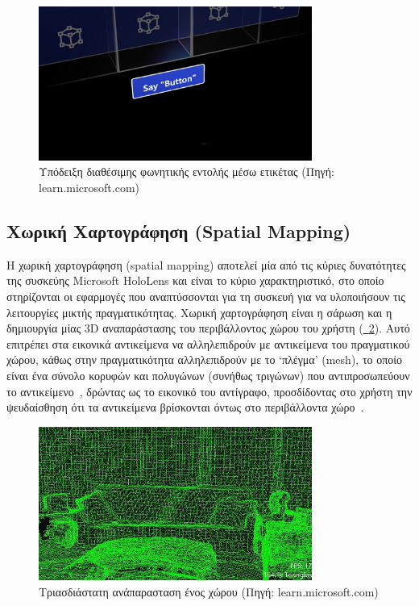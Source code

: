 \begin{enumerate}
    \begin{figure}[!ht]
        \centering
        \includegraphics[width=0.8\textwidth]{images/hololens_interaction_voice.jpg}
        \caption{Υπόδειξη διαθέσιμης φωνητικής εντολής μέσω ετικέτας {\footnotesize (Πηγή: learn.microsoft.com)}}\label{fig:hololensInteractionVoice}
    \end{figure}
\end{enumerate}

\subsection{Χωρική Χαρτογράφηση (Spatial Mapping)}\label{subsec:hololensSpatialMapping}
Η χωρική χαρτογράφηση (spatial mapping) αποτελεί μία από τις κύριες δυνατότητες της συσκεύης Microsoft HoloLens και είναι το κύριο χαρακτηριστικό, στο οποίο στηρίζονται οι εφαρμογές που αναπτύσσονται για τη συσκευή για να υλοποιήσουν τις λειτουργίες μικτής πραγματικότητας. Χωρική χαρτογράφηση είναι η σάρωση και η δημιουργία μίας 3D αναπαράστασης του περιβάλλοντος χώρου του χρήστη (\hyperref[fig:spatialMappingExample]{\schema~\ref*{fig:spatialMappingExample}}). Αυτό επιτρέπει στα εικονικά αντικείμενα να αλληλεπιδρούν με αντικείμενα του πραγματικού χώρου, κάθως στην πραγματικότητα αλληλεπιδρούν με το `πλέγμα' (mesh), το οποίο είναι ένα σύνολο κορυφών και πολυγώνων (συνήθως τριγώνων) που αντιπροσωπεύουν το αντικείμενο~\cite{a2006_mesh}, δρώντας ως το εικονικό του αντίγραφο, προσδίδοντας στο χρήστη την ψευδαίσθηση ότι τα αντικείμενα βρίσκονται όντως στο περιβάλλοντα χώρο~\cite{mattzmsft_2023_spatial}.

\begin{figure}[!ht]
    \centering
    \includegraphics[width=0.8\textwidth]{images/spatial_mapping_example.jpg}
    \caption{Τριασδιάστατη ανάπαρασταση ένος χώρου {\footnotesize (Πηγή: learn.microsoft.com)}}\label{fig:spatialMappingExample}
\end{figure}

